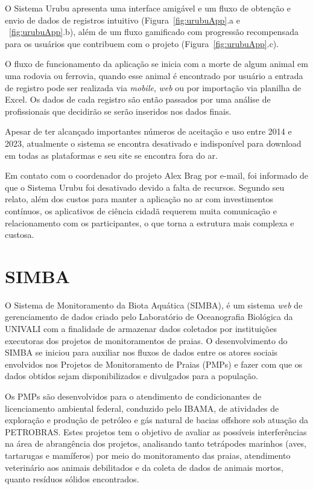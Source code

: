 O Sistema Urubu apresenta uma interface amigável e um fluxo de obtenção e envio de dados de registros intuitivo (Figura~\ref{fig:urubuApp}.a e ~\ref{fig:urubuApp}.b), além de um fluxo gamificado com progressão recompensada para os usuários que contribuem com o projeto (Figura~\ref{fig:urubuApp}.c).

O fluxo de funcionamento da aplicação se inicia com a morte de algum animal em uma rodovia ou ferrovia, quando esse animal é encontrado por usuário a entrada de registro pode ser realizada via \textit{mobile}, \textit{web} ou por importação via planilha de Excel. Os dados de cada registro são então passados por uma análise de profissionais que decidirão se serão inseridos nos dados finais.

Apesar de ter alcançado importantes números de aceitação e uso entre 2014 e 2023, atualmente o sistema se encontra desativado e indisponível para download em todas as plataformas e seu site se encontra fora do ar.

Em contato com o coordenador do projeto Alex Brag por e-mail, foi informado de que o Sistema Urubu foi desativado devido a falta de recursos. Segundo seu relato, além dos custos para manter a aplicação no ar com investimentos contínuos, os aplicativos de ciência cidadã requerem muita comunicação e relacionamento com os participantes, o que torna a estrutura mais complexa e custosa.

\section{SIMBA}\label{simba}

O Sistema de Monitoramento da Biota Aquática (SIMBA), é um sistema \textit{web} de gerenciamento de dados criado pelo Laboratório de Oceanografia Biológica da UNIVALI com a finalidade de armazenar dados coletados por instituições executoras dos projetos de monitoramentos de praias. O desenvolvimento do SIMBA se iniciou para auxiliar nos fluxos de dados entre os atores sociais envolvidos nos Projetos de Monitoramento de Praias (PMPs) e fazer com que os dados obtidos sejam disponibilizados e divulgados para a população.

Os PMPs são desenvolvidos para o atendimento de condicionantes de licenciamento ambiental federal, conduzido pelo IBAMA, de atividades de exploração e produção de petróleo e gás natural de bacias offshore sob atuação da PETROBRAS. Estes projetos tem o objetivo de avaliar as possíveis interferências na área de abrangência dos projetos, analisando tanto tetrápodes marinhos (aves, tartarugas e mamíferos) por meio do monitoramento das praias, atendimento veterinário aos animais debilitados e da coleta de dados de animais mortos, quanto resíduos sólidos encontrados.

